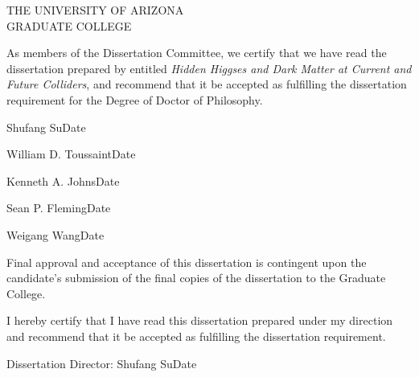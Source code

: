 \cleardoublepage
\begin{center}
  {\scshape THE UNIVERSITY OF ARIZONA\\
  GRADUATE COLLEGE}
\end{center}
As members of the Dissertation Committee, we certify that we have read the dissertation prepared by {\@author} entitled \emph{Hidden Higgses and Dark Matter at Current and Future Colliders}, and recommend that it be accepted as fulfilling the dissertation requirement for the Degree of Doctor of Philosophy.
\vfill

\noindent \hrulefill

\smallskip

\noindent Shufang Su\hfill Date
\bigskip\bigskip

\noindent \hrulefill
\smallskip

\noindent William D. Toussaint\hfill Date
\bigskip\bigskip

\noindent \hrulefill
\smallskip

\noindent Kenneth A. Johns\hfill Date
\bigskip\bigskip

\noindent \hrulefill

\smallskip

\noindent Sean P. Fleming\hfill Date
\bigskip\bigskip

\noindent \hrulefill

\smallskip

\noindent Weigang Wang\hfill Date
\vfill

\noindent Final approval and acceptance of this dissertation is contingent upon the candidate’s submission of the final copies of the dissertation to the Graduate College. 

\vfill
\noindent I hereby certify that I have read this dissertation prepared under my direction and recommend that it be accepted as fulfilling the dissertation requirement.

\bigskip\bigskip
\noindent\hrulefill
\smallskip

\noindent Dissertation Director: Shufang Su\hfill Date


